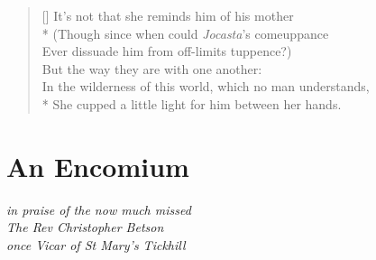 \documentclass[openany]{amsbook}
\newcommand{\poeticmarginnote}[1]{\marginnote{\footnotesize #1}}
\begin{document}
\settowidth{\versewidth}{In the wilderness of this world, which no man understands,}
\begin{verse}[\versewidth]
\vin It's not that she reminds him of his mother\poeticmarginnote{ES}\\*
\vin \vin (Though since when could \textit{Jocasta}'s comeuppance\\
\vin \vin Ever dissuade him from off-limits tuppence?)\\
\vin But the way they are with one another:\\
In the wilderness of this world, which no man understands,\poeticmarginnote{Bunyan}\\*
She cupped a little light for him between her hands.
\end{verse}


\chapter*{An Encomium}

\begin{center}
\textit{in praise of the now much missed}\\
\textit{The Rev Christopher Betson}\\
\textit{once Vicar of St Mary's Tickhill}
\end{center}

\bigskip
\end{document}
